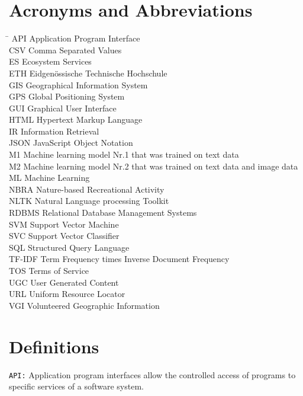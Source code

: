 \section*{Acronyms and Abbreviations}
\begin{tabbing}
 \hspace*{1.6cm}  \= \kill
 API \> Application Program Interface \\
 CSV \> Comma Separated Values \\
 ES \> Ecosystem Services \\
 ETH \> Eidgen\"{o}ssische Technische Hochschule \\
 GIS \> Geographical Information System \\
 GPS \> Global Positioning System \\
 GUI \> Graphical User Interface \\
 HTML \> Hypertext Markup Language \\
 IR \> Information Retrieval \\
 JSON \> JavaScript Object Notation \\
 M1 \> Machine learning model Nr.1 that was trained on text data \\
 M2 \> Machine learning model Nr.2 that was trained on text data and image data \\
 ML \> Machine Learning \\
 NBRA \> Nature-based Recreational Activity \\
 NLTK \> Natural Language processing Toolkit \\ 
 RDBMS \> Relational Database Management Systems \\
 SVM \> Support Vector Machine \\
 SVC \> Support Vector Classifier \\
 SQL \> Structured Query Language \\
 TF-IDF \> Term Frequency times Inverse Document Frequency \\
 TOS \> Terms of Service \\
 UGC \> User Generated Content \\
 URL \> Uniform Resource Locator \\ 
 VGI \> Volunteered Geographic Information
\end{tabbing}

\clearpage

\section*{Definitions} \label{definitions}
\texttt{API:} Application program interfaces allow the controlled access of programs to specific services of a software system. 
\newline

